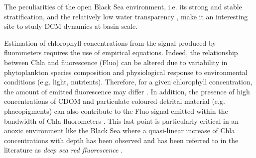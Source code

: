 \documentclass[journal abbreviation, manuscript]{copernicus}
\begin{document}
The peculiarities of the open Black Sea environment, i.e. its strong and stable stratification, and the relatively low water transparency \citep{Kara2005}, make it an interesting site to study DCM dynamics at basin scale. 

Estimation of chlorophyll concentrations from the signal produced by fluorometers requires the use of empirical equations. Indeed, the relationship between Chla and fluorescence (Fluo) can be altered due to variability in phytoplankton species composition and physiological response to environmental conditions (e.g. light, nutrients). Therefore, for a given chlorophyll concentration, the amount of emitted fluorescence may differ \citep{Claustre2009, Xing2011, Xing2012}. In addition, the presence of high concentrations of CDOM and particulate coloured detrital material (e.g. phaeopigments) can also contribute to the Fluo signal emitted within the bandwidth of Chla fluorometers \citep{Cullen1982,Proctor2010}.
This last point is particularly critical in an anoxic environment like the Black Sea \citep{Coble1991} where a quasi-linear increase of Chla concentrations with depth has been observed \citep{Xing2017} and has been referred to in the literature as \textit{deep sea red fluorescence} \cite[e.g.][]{Roettgers2012}. 
\end{document}
